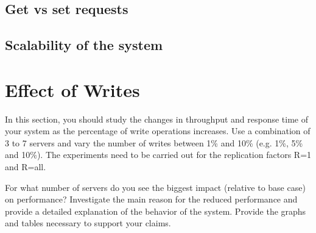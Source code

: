 \documentclass[11pt]{article}
\begin{document}
\subsection{Get vs set requests}

\subsection{Scalability of the system}

\pagebreak

\section{Effect of Writes}

In this section, you should study the changes in throughput and response time of your system as the percentage of write operations increases. Use a combination of 3 to 7 servers and vary the number of writes between 1\% and 10\% (e.g. 1\%, 5\% and 10\%). The experiments need to be carried out for the replication factors R=1 and R=all.  

For what number of servers do you see the biggest impact (relative to base case) on performance? Investigate the main reason for the reduced performance and provide a detailed explanation of the behavior of the system. Provide the graphs and tables necessary to support your claims.

 
\end{document}

